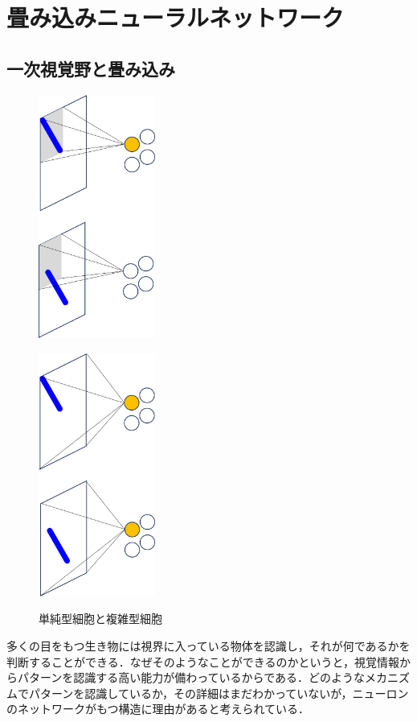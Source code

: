 \documentclass[a4paper,11pt]{jsreport}
\begin{document}
\section{畳み込みニューラルネットワーク}
\subsection{一次視覚野と畳み込み}
\begin{figure}[H]
  \begin{minipage}[b]{0.5\linewidth}
    \centering
    \includegraphics[height=8cm]{image/単純型細胞.png}
    \label{単純型細胞}
  \end{minipage}
  \begin{minipage}[b]{0.5\linewidth}
    \centering
    \includegraphics[height=8cm]{image/複雑型細胞.png}
    \label{複雑型細胞}
  \end{minipage}
  \caption{単純型細胞と複雑型細胞}
\end{figure}
多くの目をもつ生き物には視界に入っている物体を認識し，それが何であるかを判断することができる．なぜそのようなことができるのかというと，視覚情報からパターンを認識する高い能力が備わっているからである．どのようなメカニズムでパターンを認識しているか，その詳細はまだわかっていないが，ニューロンのネットワークがもつ構造に理由があると考えられている．\par
\end{document}
